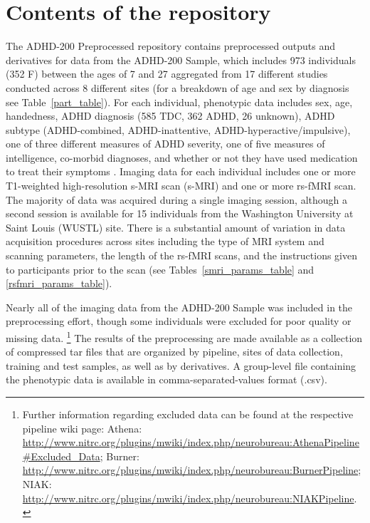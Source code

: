 \documentclass[preprint,12pt,3p]{elsarticle}
\begin{document}
\section{Contents of the repository}

The ADHD-200 Preprocessed repository contains preprocessed outputs and derivatives for data from the ADHD-200 Sample, which includes 973 individuals (352 F) between the ages of 7 and 27 aggregated from 17 different studies conducted across 8 different sites (for a breakdown of age and sex by diagnosis see Table~\ref{part_table}). For each individual, phenotypic data includes sex, age, handedness, ADHD diagnosis (585 TDC, 362 ADHD, 26 unknown), ADHD subtype (ADHD-combined, ADHD-inattentive, ADHD-hyperactive/impulsive), one of three different measures of ADHD severity, one of five measures of intelligence, co-morbid diagnoses, and whether or not they have used medication to treat their symptoms \cite{Milham2012}. Imaging data for each individual includes one or more T1-weighted high-resolution s-MRI scan (s-MRI) and one or more rs-fMRI scan. The majority of data was acquired during a single imaging session, although a second session is available for 15 individuals from the Washington University at Saint Louis (WUSTL) site. There is a substantial amount of variation in data acquisition procedures across sites including the type of MRI system and scanning parameters, the length of the rs-fMRI scans, and the instructions given to participants prior to the scan (see Tables~\ref{smri_params_table} and \ref{rsfmri_params_table}). 

Nearly all of the imaging data from the ADHD-200 Sample was included in the preprocessing effort, though some individuals were excluded for poor quality or missing data.
\footnote{Further information regarding excluded data can be found at the respective pipeline wiki page: Athena: \url{http://www.nitrc.org/plugins/mwiki/index.php/neurobureau:AthenaPipeline#Excluded_Data}; Burner: \url{http://www.nitrc.org/plugins/mwiki/index.php/neurobureau:BurnerPipeline}; NIAK: \url{http://www.nitrc.org/plugins/mwiki/index.php/neurobureau:NIAKPipeline}.}
The results of the preprocessing are made available as a collection of compressed tar files that are organized by pipeline, sites of data collection, training and test samples, as well as by derivatives. A group-level file containing the phenotypic data is available in comma-separated-values format (.csv). 
\end{document}
